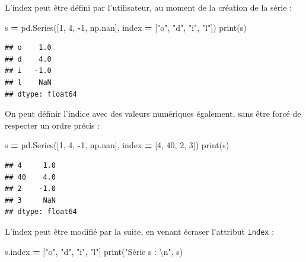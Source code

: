 \documentclass[
  12pt,
]{book}
\newenvironment{Shaded}{\begin{snugshade}}{\end{snugshade}}
\newcommand{\BuiltInTok}[1]{#1}
\newcommand{\CharTok}[1]{\textcolor[rgb]{0.31,0.60,0.02}{#1}}
\newcommand{\DecValTok}[1]{\textcolor[rgb]{0.00,0.00,0.81}{#1}}
\newcommand{\NormalTok}[1]{#1}
\newcommand{\OperatorTok}[1]{\textcolor[rgb]{0.81,0.36,0.00}{\textbf{#1}}}
\newcommand{\StringTok}[1]{\textcolor[rgb]{0.31,0.60,0.02}{#1}}
\numberwithin{equation}{section}
\numberwithin{countremarque}{section}
\begin{document}
L'index peut être défini par l'utilisateur, au moment de la création de la série :

\begin{Shaded}
\begin{Highlighting}[]
\NormalTok{s }\OperatorTok{=}\NormalTok{ pd.Series([}\DecValTok{1}\NormalTok{, }\DecValTok{4}\NormalTok{, }\OperatorTok{{-}}\DecValTok{1}\NormalTok{, np.nan],}
\NormalTok{             index }\OperatorTok{=}\NormalTok{ [}\StringTok{"o"}\NormalTok{, }\StringTok{"d"}\NormalTok{, }\StringTok{"i"}\NormalTok{, }\StringTok{"l"}\NormalTok{])}
\BuiltInTok{print}\NormalTok{(s)}
\end{Highlighting}
\end{Shaded}

\begin{lstlisting}
## o    1.0
## d    4.0
## i   -1.0
## l    NaN
## dtype: float64
\end{lstlisting}

On peut définir l'indice avec des valeurs numériques également, sans être forcé de respecter un ordre précis :

\begin{Shaded}
\begin{Highlighting}[]
\NormalTok{s }\OperatorTok{=}\NormalTok{ pd.Series([}\DecValTok{1}\NormalTok{, }\DecValTok{4}\NormalTok{, }\OperatorTok{{-}}\DecValTok{1}\NormalTok{, np.nan],}
\NormalTok{             index }\OperatorTok{=}\NormalTok{ [}\DecValTok{4}\NormalTok{, }\DecValTok{40}\NormalTok{, }\DecValTok{2}\NormalTok{, }\DecValTok{3}\NormalTok{])}
\BuiltInTok{print}\NormalTok{(s)}
\end{Highlighting}
\end{Shaded}

\begin{lstlisting}
## 4     1.0
## 40    4.0
## 2    -1.0
## 3     NaN
## dtype: float64
\end{lstlisting}

L'index peut être modifié par la suite, en venant écraser l'attribut \texttt{index} :

\begin{Shaded}
\begin{Highlighting}[]
\NormalTok{s.index }\OperatorTok{=}\NormalTok{ [}\StringTok{"o"}\NormalTok{, }\StringTok{"d"}\NormalTok{, }\StringTok{"i"}\NormalTok{, }\StringTok{"l"}\NormalTok{]}
\BuiltInTok{print}\NormalTok{(}\StringTok{"Série s : }\CharTok{\textbackslash{}n}\StringTok{"}\NormalTok{, s)}
\end{Highlighting}
\end{Shaded}
\end{document}
